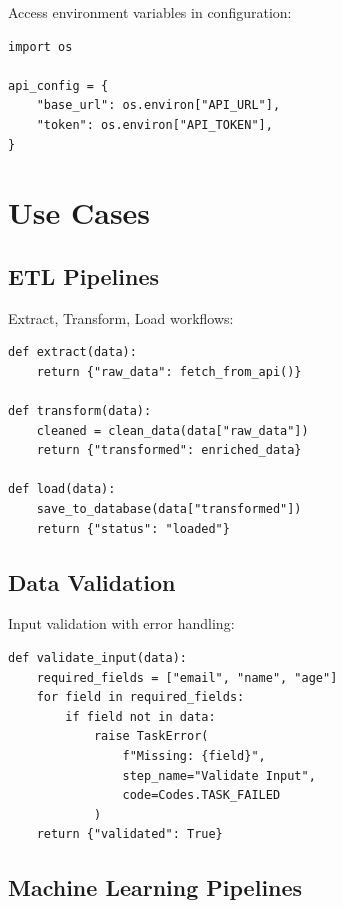 \documentclass[12pt,a4paper]{report}
\begin{document}
Access environment variables in configuration:

\begin{lstlisting}[caption={Environment Variables}, label={lst:env}]
import os

api_config = {
    "base_url": os.environ["API_URL"],
    "token": os.environ["API_TOKEN"],
}
\end{lstlisting}

\chapter{Use Cases}
\cleardoublepage

\section{ETL Pipelines}

Extract, Transform, Load workflows:

\begin{lstlisting}[caption={ETL Pipeline}, label={lst:etl}]
def extract(data):
    return {"raw_data": fetch_from_api()}

def transform(data):
    cleaned = clean_data(data["raw_data"])
    return {"transformed": enriched_data}

def load(data):
    save_to_database(data["transformed"])
    return {"status": "loaded"}
\end{lstlisting}

\section{Data Validation}

Input validation with error handling:

\begin{lstlisting}[caption={Validation Pipeline}, label={lst:validation}]
def validate_input(data):
    required_fields = ["email", "name", "age"]
    for field in required_fields:
        if field not in data:
            raise TaskError(
                f"Missing: {field}",
                step_name="Validate Input",
                code=Codes.TASK_FAILED
            )
    return {"validated": True}
\end{lstlisting}

\section{Machine Learning Pipelines}
\end{document}
